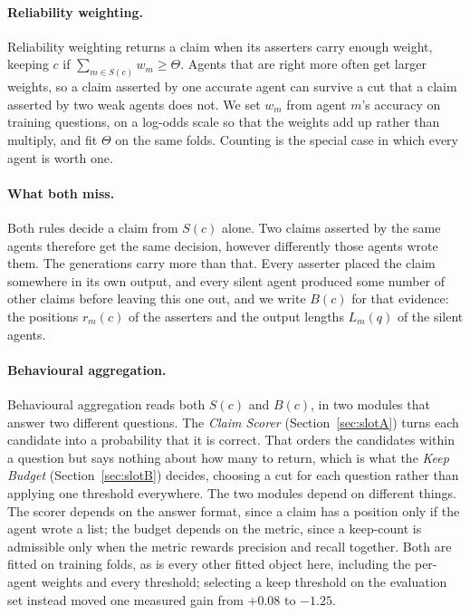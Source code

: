 \documentclass{article}
\begin{document}
\paragraph{Reliability weighting.}
Reliability weighting returns a claim when its asserters carry enough weight, keeping
$c$ if $\sum_{m \in S(c)} w_m \geq \Theta$. Agents that are right more often get larger
weights, so a claim asserted by one accurate agent can survive a cut that a claim
asserted by two weak agents does not. We set $w_m$ from agent $m$'s accuracy on training
questions, on a log-odds scale so that the weights add up rather than multiply, and fit
$\Theta$ on the same folds. Counting is the special case in which every agent is
worth one.

\paragraph{What both miss.}
Both rules decide a claim from $S(c)$ alone. Two claims asserted by the same agents
therefore get the same decision, however differently those agents wrote them. The
generations carry more than that. Every asserter placed the claim somewhere in its own
output, and every silent agent produced some number of other claims before leaving this
one out, and we write $B(c)$ for that evidence: the positions $r_m(c)$ of the asserters
and the output lengths $L_m(q)$ of the silent agents.

\paragraph{Behavioural aggregation.}
Behavioural aggregation reads both $S(c)$ and $B(c)$, in two modules that answer two
different questions. The \emph{Claim Scorer} (Section~\ref{sec:slotA}) turns each
candidate into a probability that it is correct. That orders the candidates within a
question but says nothing about how many to return, which is what the \emph{Keep Budget}
(Section~\ref{sec:slotB}) decides, choosing a cut for each question rather than applying
one threshold everywhere. The two modules depend on different things. The scorer depends
on the answer format, since a claim has a position only if the agent wrote a list; the
budget depends on the metric, since a keep-count is admissible only when the metric
rewards precision and recall together. Both are fitted on training folds, as is every
other fitted object here, including the per-agent weights and every threshold; selecting
a keep threshold on the evaluation set instead moved one measured gain from $+0.08$ to
$-1.25$.
\end{document}

